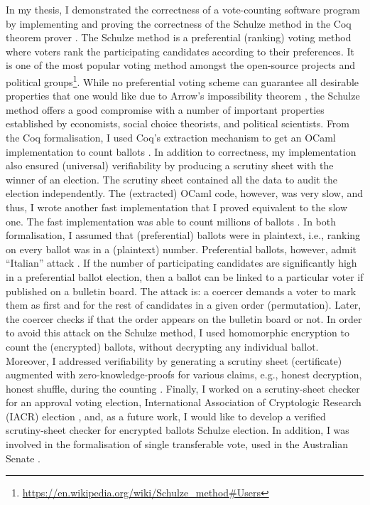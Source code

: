 \documentclass[a4paper]{article}
\begin{document}
In my thesis, I demonstrated the correctness of a vote-counting software program 
by implementing and proving the correctness of the Schulze method in the Coq theorem 
prover \cite{10.1007/978-3-319-66107-0_26}. 
The Schulze method is a preferential (ranking) voting method where voters rank the participating 
candidates according to their preferences. It is one of the most popular voting method amongst the open-source projects and 
political groups\footnote{\url{https://en.wikipedia.org/wiki/Schulze_method#Users}}.
While no preferential voting scheme can guarantee all
desirable properties that one would like due to Arrow's impossibility theorem \cite{arrow1950difficulty}, 
the Schulze method offers a good compromise with a number of important properties established by economists, 
social choice theorists, and political scientists.  From the Coq formalisation, 
I used Coq's extraction mechanism to get an OCaml implementation to count ballots \cite{10.1007/978-3-319-66107-0_26}.
In addition to correctness, my implementation also
ensured (universal) verifiability by producing a scrutiny sheet 
with the winner of an election. The scrutiny sheet contained all the data to audit the election independently. 
The (extracted) OCaml code, however, was 
very slow, and thus, I wrote another fast implementation that I proved equivalent to the slow one.
The fast implementation was able to count millions of ballots \cite{bennett2017no}.
In both formalisation, I assumed that (preferential) ballots were in plaintext, i.e., 
ranking on every ballot was in a (plaintext) number.  Preferential ballots, 
however, admit ``Italian'' attack \cite{Otten, Benaloh:2009:SSC}. 
If the number of participating candidates are significantly high in 
a preferential ballot election,
then a ballot can be linked to a particular voter if published on a bulletin board.
The attack is: a coercer demands a voter to mark them as first and for the rest of candidates
in a given order (permutation). Later, the coercer checks if that the order appears 
on the bulletin board or not. In order to
avoid this attack on the Schulze method, I used homomorphic encryption to count the (encrypted) ballots, without decrypting 
any individual ballot. Moreover, I addressed verifiability by generating a scrutiny sheet (certificate) 
augmented with zero-knowledge-proofs for various claims, e.g., honest decryption, honest shuffle,  
during the counting \cite{10.1007/978-3-030-41600-3_4}. 
Finally, I worked on a scrutiny-sheet checker for an approval voting election,
International Association of Cryptologic Research (IACR) election \cite{10.1145/3319535.3354247}, 
and, as a future work, I would like to develop a verified scrutiny-sheet checker for encrypted 
ballots Schulze election.
In addition, I was involved in the formalisation of single transferable vote, used in the Australian Senate
\cite{10.1007/978-3-030-00419-4_4}.
\end{document}
